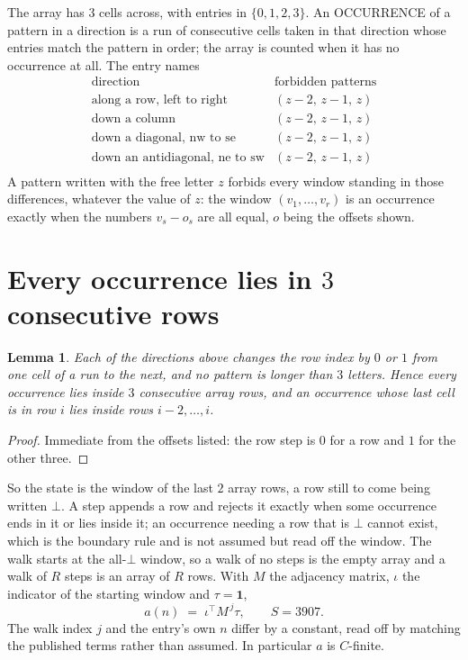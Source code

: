 \documentclass[11pt,a4paper]{article}
\theoremstyle{plain}
\newtheorem{lemma}[theorem]{Lemma}
\theoremstyle{definition}
\begin{document}
The array has $3$ cells across, with entries in $\{0,1,2,3\}$. An OCCURRENCE of a pattern in a
direction is a run of consecutive cells taken in that direction whose entries match the pattern
in order; the array is counted when it has no occurrence at all. The entry names
\[
\begin{array}{ll}
\text{direction} & \text{forbidden patterns} \\[2pt]
\text{along a row, left to right} & (z-2,\,z-1,\,z) \\
\text{down a column} & (z-2,\,z-1,\,z) \\
\text{down a diagonal, nw to se} & (z-2,\,z-1,\,z) \\
\text{down an antidiagonal, ne to sw} & (z-2,\,z-1,\,z) \\
\end{array}
\]
 A pattern written with the free letter $z$ forbids every window standing in those differences, whatever the value of $z$: the window $(v_1,\dots,v_r)$ is an occurrence exactly when the numbers $v_s-o_s$ are all equal, $o$ being the offsets shown.

\section{Every occurrence lies in $3$ consecutive rows}

\begin{lemma}\label{lem:win}
Each of the directions above changes the row index by $0$ or $1$ from one cell of a run to the
next, and no pattern is longer than $3$ letters. Hence every occurrence lies inside $3$
consecutive array rows, and an occurrence whose last cell is in row $i$ lies inside rows
$i-2,\dots,i$.
\end{lemma}

\begin{proof}
Immediate from the offsets listed: the row step is $0$ for a row and $1$ for the other three.
\end{proof}

So the state is the window of the last $2$ array rows, a row still to come being written
$\bot$. A step appends a row and rejects it exactly when some occurrence ends in it or lies
inside it; an occurrence needing a row that is $\bot$ cannot exist, which is the boundary rule
and is not assumed but read off the window. The walk starts at the all-$\bot$ window, so a walk
of no steps is the empty array and a walk of $R$ steps is an array of $R$ rows. With $M$ the
adjacency matrix, $\iota$ the indicator of the starting window and $\tau=\mathbf{1}$,
\[
a(n)\;=\;\iota^{\!\top}M^{\,j}\tau ,\qquad S=3907.
\]
The walk index $j$ and the entry's own $n$ differ by a constant, read off by matching the
published terms rather than assumed. In particular $a$ is $C$-finite.
\end{document}
